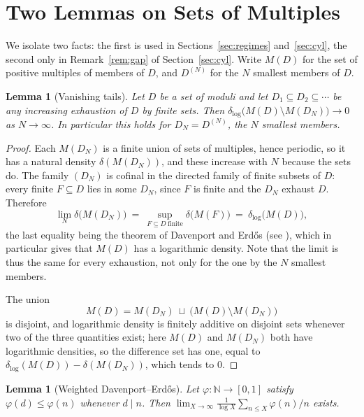 \documentclass[11pt]{article}
\theoremstyle{plain}
\newtheorem{lemma}[theorem]{Lemma}
\theoremstyle{definition}
\newcommand{\N}{\mathbb{N}}
\newcommand{\dlog}{\delta_{\log}}
\begin{document}
\section{Two Lemmas on Sets of Multiples}\label{sec:lemmas}

We isolate two facts: the first is used in
Sections~\ref{sec:regimes} and~\ref{sec:cyl}, the second only
in Remark~\ref{rem:gap} of Section~\ref{sec:cyl}.  Write $M(D)$
for the set of positive multiples of members of $D$, and
$D^{(N)}$ for the $N$ smallest members of $D$.

\begin{lemma}[Vanishing tails]\label{lem:tail}
Let $D$ be a set of moduli and let $D_1\subseteq D_2\subseteq
\cdots$ be any increasing exhaustion of $D$ by finite sets.
Then $\dlog\bigl(M(D)\setminus M(D_N)\bigr)\to0$ as
$N\to\infty$.  In particular this holds for $D_N=D^{(N)}$, the
$N$ smallest members.
\end{lemma}

\begin{proof}
Each $M(D_N)$ is a finite union of sets of multiples, hence
periodic, so it has a natural density $\delta(M(D_N))$, and
these increase with $N$ because the sets do.  The family
$(D_N)$ is cofinal in the directed family of finite subsets of
$D$: every finite $F\subseteq D$ lies in some $D_N$, since
$F$ is finite and the $D_N$ exhaust $D$.  Therefore
\[
  \lim_N\delta\bigl(M(D_N)\bigr)
  \ =\ \sup_{F\subseteq D\ \text{finite}}\delta\bigl(M(F)\bigr)
  \ =\ \dlog\bigl(M(D)\bigr),
\]
the last equality being the theorem of Davenport and Erd\H{o}s
\cite{DE1936,DE1951} (see \cite[Ch.~0]{Hall}), which in
particular gives that $M(D)$ has a logarithmic density.  Note
that the limit is thus the same for every exhaustion, not only
for the one by the $N$ smallest members.

The union
\[
  M(D)=M(D_N)\ \sqcup\ \bigl(M(D)\setminus M(D_N)\bigr)
\]
is disjoint, and logarithmic density is finitely additive on
disjoint sets whenever two of the three quantities exist; here
$M(D)$ and $M(D_N)$ both have logarithmic densities, so the
difference set has one, equal to
$\dlog(M(D))-\delta(M(D_N))$, which tends to $0$.
\end{proof}

\begin{lemma}[Weighted Davenport--Erd\H{o}s]\label{lem:weight}
Let $\varphi:\N\to[0,1]$ satisfy $\varphi(d)\le\varphi(n)$
whenever $d\mid n$.  Then
$\lim_{X\to\infty}\frac{1}{\log X}\sum_{n\le X}\varphi(n)/n$
exists.
\end{lemma}
\end{document}
